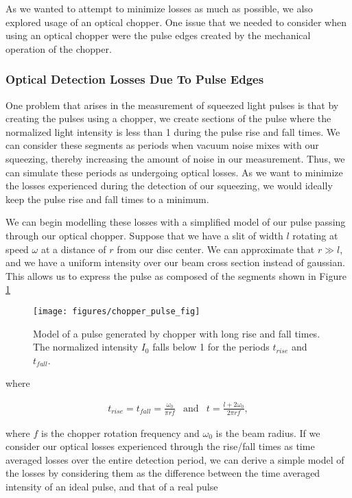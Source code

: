 As we wanted to attempt to minimize losses as much as possible, we also explored usage of an optical chopper.  One issue that we needed to consider when using an optical chopper were the pulse edges created by the mechanical operation of the chopper.


\subsubsection{Optical Detection Losses Due To Pulse Edges} 
\label{optical_losses_due_to_pulse_edges} 
One problem that arises in the measurement of squeezed light pulses is that by creating the pulses using a chopper, we create sections of the pulse where the normalized light intensity is less than 1 during the pulse rise and fall times.  We can consider these segments as periods when vacuum noise mixes with our squeezing, thereby increasing the amount of noise in our measurement.  Thus, we can simulate these periods as undergoing optical losses.  As we want to minimize the losses experienced during the detection of our squeezing, we would ideally keep the pulse rise and fall times to a minimum.

We can begin modelling these losses with a simplified model of our pulse passing through our optical chopper.  Suppose that we have a slit of width $l$ rotating at speed $\omega$ at a distance of $r$ from our disc center.  We can approximate that $r \gg l$, and we have a uniform intensity over our beam cross section instead of gaussian.  This allows us to express the pulse as composed of the segments shown in Figure \ref{fig:chopper_pulse_fig} 

\begin{figure}[!ht] 
 \centering 
 \texttt{[image: figures/chopper\_pulse\_fig]} 
 \caption[Illustration of a pulse generated by an optical chopper]{Model of a pulse generated by chopper with long rise and fall times.  The normalized intensity $I_0$ falls below 1 for the periods $t_{rise}$ and $t_{fall}$.} 
 \label{fig:chopper_pulse_fig} 
\end{figure}

\noindent
where

\begin{eqnarray}
  \label{eq:pulse_time_segments}
  t_{rise} = t_{fall} = \frac{\omega_0}{\pi r f}  & \text{and} & t = \frac{l + 2\omega_0}{2 \pi r f}  ,
\end{eqnarray}

\noindent
where $f$ is the chopper rotation frequency and $\omega_0$ is the beam radius.  If we consider our optical losses experienced through the rise/fall times as time averaged losses over the entire detection period, we can derive a simple model of the losses by considering them as the difference between the time averaged intensity of an ideal pulse, and that of a real pulse

